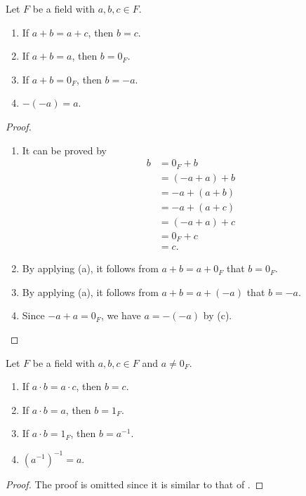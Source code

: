 \begin{proposition}\label{prop:field-addition}
  Let $F$ be a field with $a, b, c \in F$.
  \begin{enumerate}
    \item If $a + b = a + c$, then $b = c$.
    \item If $a + b = a$, then $b = 0_F$.
    \item If $a + b = 0_F$, then $b = -a$.
    \item $-(-a) = a$.
  \end{enumerate}
\end{proposition}
\begin{proof} \leavevmode
  \begin{enumerate}
    \item It can be proved by
      \begin{align*}
        b
        &= 0_F + b      \\
        &= (-a + a) + b \\
        &= -a + (a + b) \\
        &= -a + (a + c) \\
        &= (-a + a) + c \\
        &= 0_F + c      \\
        &= c.
      \end{align*}
    \item By applying (a), it follows from $a + b = a + 0_F$ that $b = 0_F$.
    \item By applying (a), it follows from $a + b = a + (-a)$ that $b = -a$.
    \item Since $-a + a = 0_F$, we have $a = -(-a)$ by (c). \qedhere
  \end{enumerate}
\end{proof}

\begin{proposition}\label{prop:field-multiplication}
  Let $F$ be a field with $a, b, c \in F$ and $a \neq 0_F$.
  \begin{enumerate}
    \item If $a \cdot b = a \cdot c$, then $b = c$.
    \item If $a \cdot b = a$, then $b = 1_F$.
    \item If $a \cdot b = 1_F$, then $b = a^{-1}$.
    \item $(a^{-1})^{-1} = a$.
  \end{enumerate}
\end{proposition}
\begin{proof}
  The proof is omitted since it is similar to that of
  .
\end{proof}

